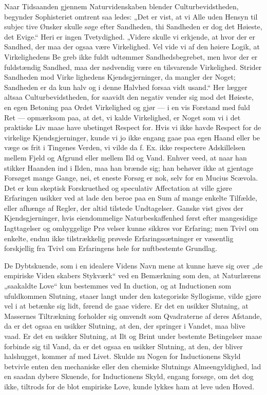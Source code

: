 \documentclass[12pt]{book}
\newcommand{\opage}[1]{\marginnote{\footnotesize\textit{[#1]}}}
\begin{document}
Naar Tidsaanden gjennem Naturvidenskaben blender
Culturbevidstheden, begynder Sophisteriet omtrent saa\-%
ledes: „Det er vist, at vi Alle uden Hensyn til subjec\-%
tive Ønsker skulle søge efter Sandheden, thi Sandheden
er dog det Høieste, det Evige.“ Heri er ingen
Tvetydighed. „Videre skulle vi erkjende, at hvor der
er Sandhed, der maa der ogsaa være Virkelighed. Vel
vide vi af den høiere Logik, at Virkelighedens Be\-%
greb ikke fuldt udtømmer Sandhedsbegrebet, men hvor
der er fuldstændig Sandhed, maa der nødvendig være en
tilsvarende Virkelighed. Strider Sandheden mod Virke\-%
lighedens Kjendsgjerninger, da mangler der Noget;
Sandheden er da kun halv og i denne Halvhed forsaa\-%
vidt usand.“ Her lægger altsaa Culturbevidstheden, for\-%
saavidt den negativ vender sig mod det Høieste, en
egen Betoning paa Ordet Virkelighed og gjør --- i en
vis Forstand med fuld Ret --- opmærksom paa, at
det, vi kalde Virkelighed, er Noget som vi i det
praktiske Liv maae have ubetinget Respect for. Hvis
vi ikke havde Respect for de virkelige Kjendsgjerninger,
kunde vi jo ikke engang gaae paa egen Haand eller be\-%
væge os frit i Tingenes Verden, vi vilde da f. Ex. ikke
respectere Adskillelsen mellem Fjeld og Afgrund eller
mellem Ild og Vand. Enhver veed, at naar han stikker
Haanden ind i Ilden, maa han brænde sig; han behøver
ikke at gjentage Forsøget mange Gange, nei, et eneste
Forsøg er nok, selv for en Mucius Scævola. Det er kun
skeptisk Forskruethed og speculativ Affectation at ville
\opage{61}\setcounter{footnote}{0}%
gjøre Erfaringen usikker ved at lade den beroe paa en
Sum af mange enkelte Tilfælde, eller afhænge af Regler,
der altid tilstede Undtagelser. Ganske vist gives der
Kjendsgjerninger, hvis eiendommelige Naturbeskaffenhed
først efter mangesidige Iagttagelser og omhyggelige Prø\-%
velser kunne sikkres vor Erfaring; men Tvivl om enkelte,
endnu ikke tilstrækkelig prøvede Erfaringssætninger er
væsentlig forskjellig fra Tvivl om Erfaringens hele for\-%
nuftbestemte Grundlag.

De Dybtskuende, som i en idealere Videns Navn
mene at kunne hæve sig over „de empiriske Viden\-%
skabers Stykværk“ ved en Bemærkning som den, at
Naturlærens „saakaldte Love“ kun bestemmes ved In\-%
duction, og at Inductionen som ufuldkommen Slutning,
staaer langt under den kategoriske Syllogisme, vilde
gjøre vel i at betænke sig lidt, førend de gaae videre.
Er det en usikker Slutning, at Massernes Tiltrækning
forholder sig omvendt som Qvadraterne af deres Afstande,
da er det ogsaa en usikker Slutning, at den, der springer
i Vandet, maa blive vaad. Er det en usikker Slutning,
at Ilt og Brint under bestemte Betingelser maae forbinde
sig til Vand, da er det ogsaa en usikker Slutning, at
den, der bliver halshugget, kommer af med Livet. Skulde
nu Nogen for Inductionens Skyld betvivle enten den
mechaniske eller den chemiske Slutnings Almeengyldighed,
lad en saadan dybere Skuende, for Inductionens Skyld,
engang forsøge, om det dog ikke, tiltrods for de blot
empiriske Love, kunde lykkes ham at leve uden Hoved.
\end{document}

